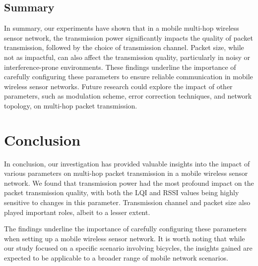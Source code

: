 \documentclass[runningheads]{llncs}
\begin{document}
\subsection{Summary}

In summary, our experiments have shown that in a mobile multi-hop wireless sensor network, the transmission power significantly impacts the quality of packet transmission, followed by the choice of transmission channel. Packet size, while not as impactful, can also affect the transmission quality, particularly in noisy or interference-prone environments. These findings underline the importance of carefully configuring these parameters to ensure reliable communication in mobile wireless sensor networks. Future research could explore the impact of other parameters, such as modulation scheme, error correction techniques, and network topology, on multi-hop packet transmission.

\section{Conclusion}

In conclusion, our investigation has provided valuable insights into the impact of various parameters on multi-hop packet transmission in a mobile wireless sensor network. We found that transmission power had the most profound impact on the packet transmission quality, with both the LQI and RSSI values being highly sensitive to changes in this parameter. Transmission channel and packet size also played important roles, albeit to a lesser extent.

The findings underline the importance of carefully configuring these parameters when setting up a mobile wireless sensor network. It is worth noting that while our study focused on a specific scenario involving bicycles, the insights gained are expected to be applicable to a broader range of mobile network scenarios.

%
%
%
% 
% 
%



\end{document}
